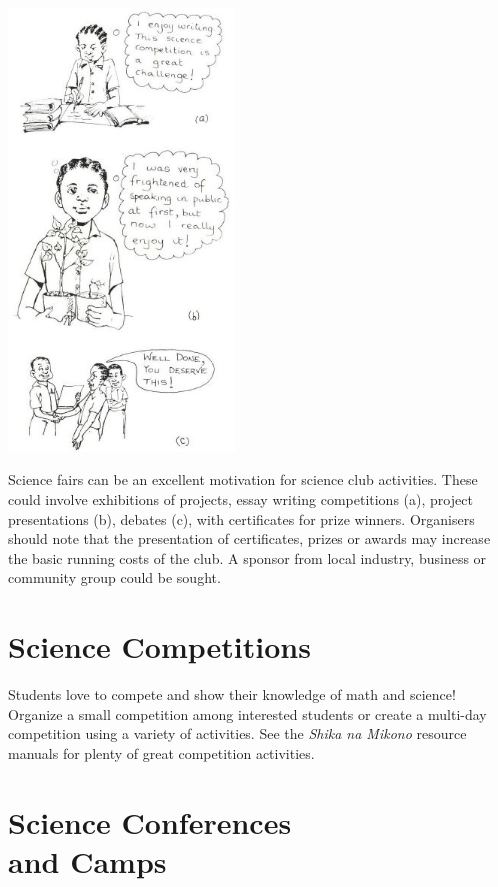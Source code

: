 \begin{multicols}{2}
\begin{center}
\includegraphics[width=0.45\textwidth]{./img/source/science-fairs.jpg}
\end{center}

Science fairs can be an excellent motivation
for science club activities. These could involve
exhibitions of projects, essay writing
competitions (a), project presentations (b),
debates (c), with certificates for prize winners.
Organisers should note that the presentation of
certificates, prizes or awards may increase the
basic running costs of the club. A sponsor from
local industry, business or community group
could be sought.

\section{Science Competitions}  

Students love to compete and show their knowledge of math and science! Organize a small competition among interested students or create a multi-day competition using a variety of activities. See the \emph{Shika na Mikono} resource manuals for plenty of great competition activities.


\section{Science Conferences \hfill \\ and Camps}  


\end{multicols}
